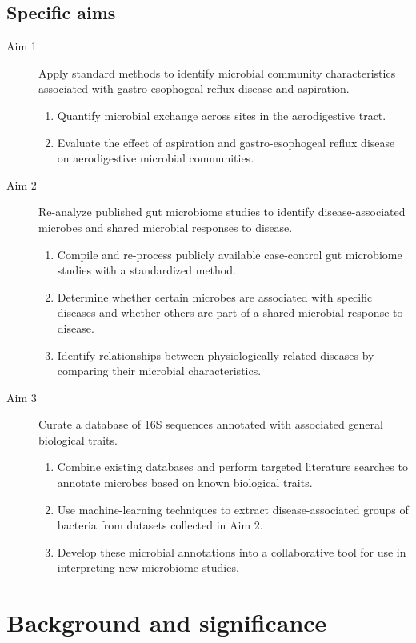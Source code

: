 \documentclass[12pt]{article}
\begin{document}
\subsection{Specific aims}
\begin{description}
	\item[Aim 1] Apply standard methods to identify microbial 
	community characteristics associated with gastro-esophogeal reflux 
	disease and aspiration.
	\begin{enumerate}
		\item Quantify microbial exchange across sites in the aerodigestive 
		tract.
		\item Evaluate the effect of aspiration and gastro-esophogeal 
		reflux disease on aerodigestive microbial communities.
	\end{enumerate}
	\item[Aim 2] Re-analyze published gut 
	microbiome studies to identify disease-associated microbes and shared
	microbial responses to disease.
	\begin{enumerate}
		\item Compile and re-process publicly available case-control gut 
		microbiome studies with a standardized method.
		\item Determine whether certain microbes are associated with specific 
		diseases and whether others are part of a shared microbial response to disease.
		\item Identify relationships between physiologically-related 
		diseases by comparing their microbial characteristics.
	\end{enumerate}
	\item[Aim 3] Curate a database of 16S sequences annotated with 
	associated general biological traits.
	\begin{enumerate}
		\item Combine existing databases and perform targeted literature searches 
		to annotate microbes based on known biological 
		traits.
		\item Use machine-learning techniques to extract disease-associated 
		groups of bacteria from datasets collected in Aim 2.
		\item Develop these microbial annotations into a collaborative 
		tool for use in interpreting new microbiome studies.
	\end{enumerate}
\end{description}
\newpage

\section{Background and significance}
\end{document}
